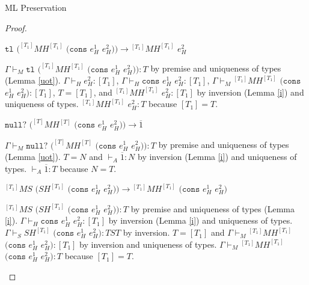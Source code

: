 \begin{theorem}{ML Preservation}
\begin{proof}

\begin{case}
$\mathtt{tl}$ $(^{[T_{1}]}MH^{[T_{1}]}$ $(\mathtt{cons}$ $e_{H}^{1}$ $e_{H}^{2}))\rightarrow{^{[T_{1}]}M}H^{[T_{1}]}$ $e_{H}^{2}$

$\Gamma\vdash_{M}\mathtt{tl}$ $(^{[T_{1}]}MH^{[T_{1}]}$ $(\mathtt{cons}$ $e_{H}^{1}$ $e_{H}^{2})):T$ by premise and uniqueness of types (Lemma \ref{uot}).  $\Gamma\vdash_{H}e_{H}^{2}:[T_{1}]$, $\Gamma\vdash_{H}\mathtt{cons}$ $e_{H}^{1}$ $e_{H}^{2}:[T_{1}]$, $\Gamma\vdash_{M}{^{[T_{1}]}M}H^{[T_{1}]}$ $(\mathtt{cons}$ $e_{H}^{1}$ $e_{H}^{2}):[T_{1}]$, $T=[T_{1}]$, and $^{[T_{1}]}MH^{[T_{1}]}$ $e_{H}^{2}:[T_{1}]$ by inversion (Lemma \ref{i}) and uniqueness of types.  $^{[T_{1}]}MH^{[T_{1}]}$ $e_{H}^{2}:T$ because $[T_{1}]=T$.
\end{case}


\begin{case}
$\mathtt{null?}$ $(^{[T]}MH^{[T]}$ $(\mathtt{cons}$ $e_{H}^{1}$ $e_{H}^{2}))\rightarrow\overline{1}$

$\Gamma\vdash_{M}\mathtt{null?}$ $(^{[T]}MH^{[T]}$ $(\mathtt{cons}$ $e_{H}^{1}$ $e_{H}^{2})):T$ by premise and uniqueness of types (Lemma \ref{uot}).  $T=N$ and $\vdash_{A}\overline{1}:N$ by inversion (Lemma \ref{i}) and uniqueness of types.  $\vdash_{A}\overline{1}:T$ because $N=T$.
\end{case}


\begin{case}
$^{[T_{1}]}MS$ $(SH^{[T_{1}]}$ $(\mathtt{cons}$ $e_{H}^{1}$ $e_{H}^{2}))\rightarrow{^{[T_{1}]}M}H^{[T_{1}]}$ $(\mathtt{cons}$ $e_{H}^{1}$ $e_{H}^{2})$

$^{[T_{1}]}MS$ $(SH^{[T_{1}]}$ $(\mathtt{cons}$ $e_{H}^{1}$ $e_{H}^{2})):T$ by premise and uniqueness of types (Lemma \ref{i}).  $\Gamma\vdash_{H}\mathtt{cons}$ $e_{H}^{1}$ $e_{H}^{2}:[T_{1}]$ by inversion (Lemma \ref{i}) and uniqueness of types.  $\Gamma\vdash_{S}SH^{[T_{1}]}$ $(\mathtt{cons}$ $e_{H}^{1}$ $e_{H}^{2}):TST$ by inversion.  $T=[T_{1}]$ and $\Gamma\vdash_{M}{^{[T_{1}]}M}H^{[T_{1}]}$ $(\mathtt{cons}$ $e_{H}^{1}$ $e_{H}^{2}):[T_{1}]$ by inversion and uniqueness of types.  $\Gamma\vdash_{M}{^{[T_{1}]}M}H^{[T_{1}]}$ $(\mathtt{cons}$ $e_{H}^{1}$ $e_{H}^{2}):T$ because $[T_{1}]=T$.
\end{case}

\end{proof}

\end{theorem}
